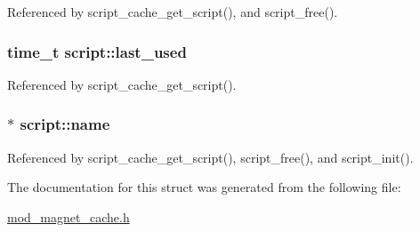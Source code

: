 Referenced by script\-\_\-cache\-\_\-get\-\_\-script(), and script\-\_\-free().

\hypertarget{structscript_adad5b6320024766da6837691025d547d}{
\subsubsection[{last\-\_\-used}]{\setlength{\rightskip}{0pt plus 5cm}time\-\_\-t script\-::last\-\_\-used}}\label{structscript_adad5b6320024766da6837691025d547d}


Referenced by script\-\_\-cache\-\_\-get\-\_\-script().

\hypertarget{structscript_a7ab3fb09fddf822a555ee21ff11e937a}{
\subsubsection[{name}]{$\ast$ script\-::name}}\label{structscript_a7ab3fb09fddf822a555ee21ff11e937a}


Referenced by script\-\_\-cache\-\_\-get\-\_\-script(), script\-\_\-free(), and script\-\_\-init().



The documentation for this struct was generated from the following file\-:\begin{DoxyCompactItemize}
\item 
\hyperlink{mod__magnet__cache_8h}{mod\-\_\-magnet\-\_\-cache.\-h}\end{DoxyCompactItemize}

